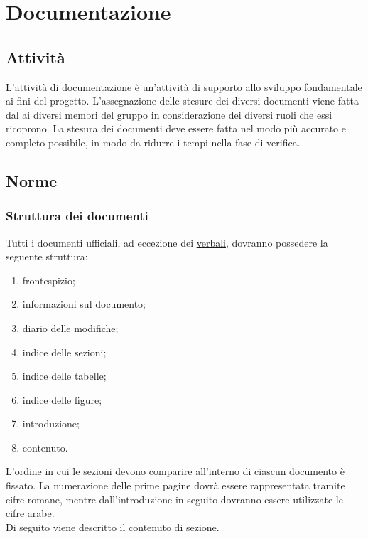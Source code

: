 \section{Documentazione}
	\subsection{Attività}
	L'attività di documentazione è un'attività di supporto allo sviluppo fondamentale ai fini del progetto.
	L'assegnazione delle stesure dei diversi documenti viene fatta dal  ai diversi membri del gruppo in considerazione dei diversi ruoli che essi ricoprono.
	La stesura dei documenti deve essere fatta nel modo più accurato e completo possibile, in modo da ridurre i tempi nella fase di verifica.
	\subsection{Norme}
		\subsubsection{Struttura dei documenti}
			Tutti i documenti ufficiali, ad eccezione dei \hyperref[sec:verbali]{verbali}, dovranno possedere la seguente struttura:
			\begin{enumerate}
				\item frontespizio;
				\item informazioni sul documento;
				\item diario delle modifiche;
				\item indice delle sezioni;
				\item indice delle tabelle;
				\item indice delle figure;
				\item introduzione;
				\item contenuto.
			\end{enumerate}
			L’ordine in cui le sezioni devono comparire all’interno di ciascun documento è fissato. La numerazione delle prime pagine dovrà essere rappresentata tramite cifre romane, mentre dall'introduzione in seguito dovranno essere utilizzate le cifre arabe. \\
			Di seguito viene descritto il contenuto di sezione.
